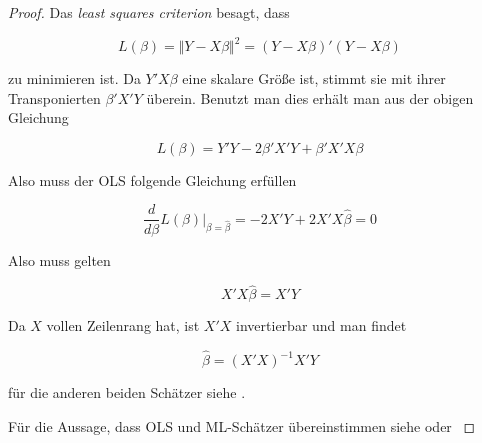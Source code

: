 \documentclass[12pt,a4paper]{article}
\theoremstyle{definition}
\theoremstyle{definition}
\theoremstyle{definition}
\theoremstyle{definition}
\begin{document}
\begin{proof}
Das \textit{least squares criterion} besagt, dass 

\begin{equation*}
L(\beta)= \Vert Y - X \beta \Vert^2 = (Y - X \beta)' (Y - X \beta) 
\end{equation*}

zu minimieren ist. Da $Y'X\beta$ eine skalare Größe ist, stimmt sie mit ihrer Transponierten $\beta'X'Y$ überein. Benutzt man dies erhält man aus der obigen Gleichung

\begin{equation*}
L(\beta) = Y'Y - 2\beta'X'Y  + \beta'X'X\beta
\end{equation*}

Also muss der OLS folgende Gleichung erfüllen

\begin{equation}
\frac{d}{d \beta} L(\beta) \vert_{\beta=\hat{\beta}} = -2X'Y + 2 X'X \hat{\beta} = 0
\end{equation}

Also muss gelten

\begin{equation}
X'X \hat{\beta} = X'Y
\end{equation}

Da $X$ vollen Zeilenrang hat, ist $X'X$ invertierbar und man findet

\begin{equation*}
\hat{\beta} = (X'X)^{-1}X'Y
\end{equation*}

für die anderen beiden Schätzer siehe \cite[4]{Liu64}.

Für die Aussage, dass OLS und ML-Schätzer übereinstimmen siehe \cite[74]{Munk13} oder \cite[3]{Liu64}
\end{proof}

\end{document}

